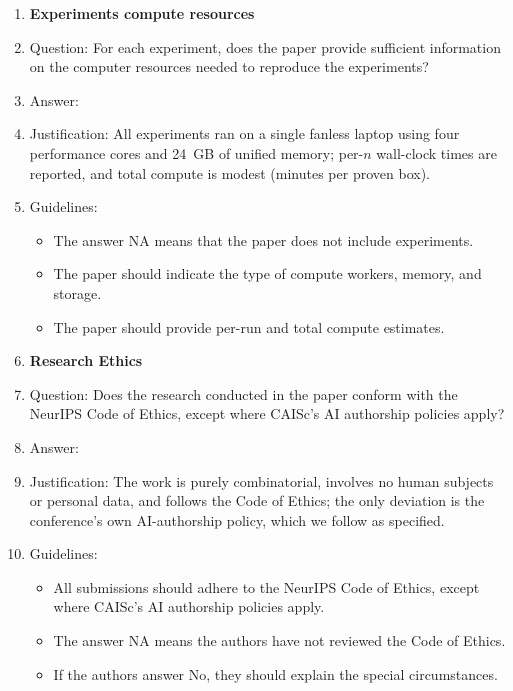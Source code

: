 \documentclass{article}
\begin{document}
\begin{enumerate}
\item {\bf Experiments compute resources}
    \item[] Question: For each experiment, does the paper provide sufficient information on the computer resources needed to reproduce the experiments?
    \item[] Answer: \answerYes{}
    \item[] Justification: All experiments ran on a single fanless laptop using four performance cores and 24~GB of unified memory; per-$n$ wall-clock times are reported, and total compute is modest (minutes per proven box).
    \item[] Guidelines:
    \begin{itemize}
        \item The answer NA means that the paper does not include experiments.
        \item The paper should indicate the type of compute workers, memory, and storage.
        \item The paper should provide per-run and total compute estimates.
    \end{itemize}

\item {\bf Research Ethics}
    \item[] Question: Does the research conducted in the paper conform with the NeurIPS Code of Ethics, except where CAISc's AI authorship policies apply?
    \item[] Answer: \answerYes{}
    \item[] Justification: The work is purely combinatorial, involves no human subjects or personal data, and follows the Code of Ethics; the only deviation is the conference's own AI-authorship policy, which we follow as specified.
    \item[] Guidelines:
    \begin{itemize}
        \item All submissions should adhere to the NeurIPS Code of Ethics, except where CAISc's AI authorship policies apply.
        \item The answer NA means the authors have not reviewed the Code of Ethics.
        \item If the authors answer No, they should explain the special circumstances.
    \end{itemize}


\end{enumerate}
\end{document}

